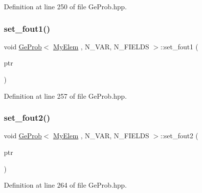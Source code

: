 Definition at line 250 of file Ge\+Prob.\+hpp.

\mbox{\label{classGeProb_a75433e7f3aec6d8f0746cd3e0e82db96}} 
\subsubsection{\texorpdfstring{set\+\_\+fout1()}{set\_fout1()}}
{\footnotesize\ttfamily void \hyperlink{classGeProb}{Ge\+Prob}$<$ \hyperlink{DG__Prob_8h_a83cd887ced9a6587428f267e50cd4787}{My\+Elem} , N\+\_\+\+V\+AR, N\+\_\+\+F\+I\+E\+L\+DS $>$\+::set\+\_\+fout1 (\begin{DoxyParamCaption}\item[{F\+I\+LE $\ast$}]{ptr }\end{DoxyParamCaption})\hspace{0.3cm}{\ttfamily [inherited]}}



Definition at line 257 of file Ge\+Prob.\+hpp.

\mbox{\label{classGeProb_a18762ac0ce4ba659b15e97a5521bc456}} 
\subsubsection{\texorpdfstring{set\+\_\+fout2()}{set\_fout2()}}
{\footnotesize\ttfamily void \hyperlink{classGeProb}{Ge\+Prob}$<$ \hyperlink{DG__Prob_8h_a83cd887ced9a6587428f267e50cd4787}{My\+Elem} , N\+\_\+\+V\+AR, N\+\_\+\+F\+I\+E\+L\+DS $>$\+::set\+\_\+fout2 (\begin{DoxyParamCaption}\item[{F\+I\+LE $\ast$}]{ptr }\end{DoxyParamCaption})\hspace{0.3cm}{\ttfamily [inherited]}}



Definition at line 264 of file Ge\+Prob.\+hpp.

\mbox{\label{classGeProb_a2fa255c26250f6ee540b910949f530ed}} 
